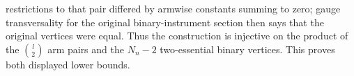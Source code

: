 restrictions to that pair differed by armwise constants summing to zero; gauge transversality for the original binary-instrument section then says that the original vertices were equal. Thus the construction is injective on the product of the \(\binom l2\) arm pairs and the \(N_n-2\) two-essential binary vertices. This proves both displayed lower bounds.